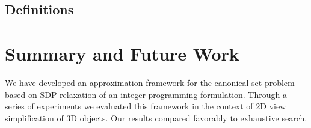 \documentclass{article}
\begin{document}
\subsection{Definitions}
\vspace{-0.1in}

\section{Summary and Future Work}
\label{sec:conclusion}

\vspace{-0.1in}
We have developed an approximation framework for the canonical set
problem based on SDP relaxation of an integer programming formulation.
Through a series of experiments we evaluated this framework in the
context of 2D view simplification of 3D objects. Our results compared
favorably to exhaustive search.





\end{document}
